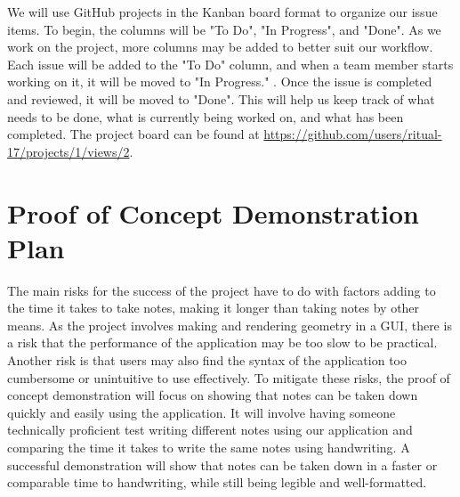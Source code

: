 \documentclass{article}
\begin{document}
  
  We will use GitHub projects in the Kanban board format to organize our 
  issue items. To begin, the columns will be "To Do", "In Progress", 
  and "Done". As we work on the project, more columns may be added to 
  better suit our workflow. Each issue will be added to the "To Do" column,
  and when a team member starts working on it, it will be moved to "In Progress."
  . Once the issue is completed and reviewed, it will be moved to
  "Done". This will help us keep track of what needs to be done, what is 
  currently being worked on, and what has been completed. The project 
  board can be found at 
  \url{https://github.com/users/ritual-17/projects/1/views/2}.
  


\section{Proof of Concept Demonstration Plan}


The main risks for the success of the project have to do with factors adding 
to the time it takes to take notes, making it longer than
taking notes by other means. As the project involves making and rendering 
geometry in a GUI, there is a risk that the performance of the 
application may be too slow to be practical. Another risk is that users may 
also find the syntax of the application too cumbersome or 
unintuitive to use effectively. To mitigate these risks, the proof of concept 
demonstration will focus on showing that notes can be taken 
down quickly and easily using the application. It will involve having someone
 technically proficient test writing different notes using our 
application and comparing the time it takes to write the same notes using 
handwriting. A successful demonstration will show that notes can be 
taken down in a faster or comparable time to handwriting, while still being 
legible and well-formatted.
\end{document}

